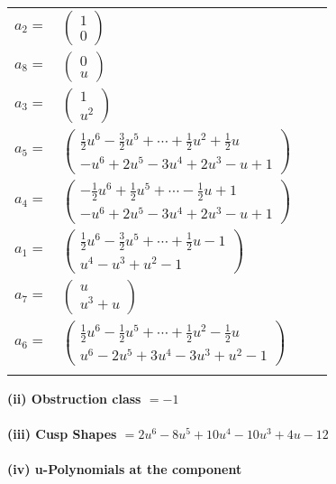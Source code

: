 \documentclass[1p]{elsarticle_modified}
\theoremstyle{definition}
\begin{document}
\begin{tabular}{m{7pt} m{180pt} m{7pt} m{180pt} }
\flushright $a_{2}=$&$\begin{pmatrix}1\\0\end{pmatrix}$ \\
\flushright $a_{8}=$&$\begin{pmatrix}0\\u\end{pmatrix}$ \\
\flushright $a_{3}=$&$\begin{pmatrix}1\\u^2\end{pmatrix}$ \\
\flushright $a_{5}=$&$\begin{pmatrix}\frac{1}{2} u^6-\frac{3}{2} u^5+\cdots+\frac{1}{2} u^2+\frac{1}{2} u\\- u^6+2 u^5-3 u^4+2 u^3- u+1\end{pmatrix}$ \\
\flushright $a_{4}=$&$\begin{pmatrix}-\frac{1}{2} u^6+\frac{1}{2} u^5+\cdots-\frac{1}{2} u+1\\- u^6+2 u^5-3 u^4+2 u^3- u+1\end{pmatrix}$ \\
\flushright $a_{1}=$&$\begin{pmatrix}\frac{1}{2} u^6-\frac{3}{2} u^5+\cdots+\frac{1}{2} u-1\\u^4- u^3+u^2-1\end{pmatrix}$ \\
\flushright $a_{7}=$&$\begin{pmatrix}u\\u^3+u\end{pmatrix}$ \\
\flushright $a_{6}=$&$\begin{pmatrix}\frac{1}{2} u^6-\frac{1}{2} u^5+\cdots+\frac{1}{2} u^2-\frac{1}{2} u\\u^6-2 u^5+3 u^4-3 u^3+u^2-1\end{pmatrix}$\\&\end{tabular}
\flushleft \textbf{(ii) Obstruction class $= -1$}\\~\\
\flushleft \textbf{(iii) Cusp Shapes $= 2 u^6-8 u^5+10 u^4-10 u^3+4 u-12$}\\~\\
\newpage\renewcommand{\arraystretch}{1}
\flushleft \textbf{(iv) u-Polynomials at the component}\newline \\
\end{document}
